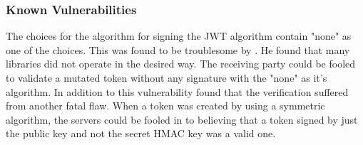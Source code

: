 \subsubsection{Known Vulnerabilities}
\begin{sloppypar}
    The choices for the algorithm for signing the JWT algorithm contain 
    "none" as one of the choices. This was found to be troublesome by 
    \citet{nonejwt}. He found that many libraries did not operate in the 
    desired way. The receiving party could be fooled to validate a mutated 
    token without any signature with the "none" as it's algorithm. In 
    addition to this vulnerability \citet{nonejwt} found that the verification 
    suffered from another fatal flaw. When a token was created by using a 
    symmetric algorithm, the servers could be fooled in to believing that a 
    token signed by just the public key and not the secret HMAC key was a valid 
    one.
\end{sloppypar}



